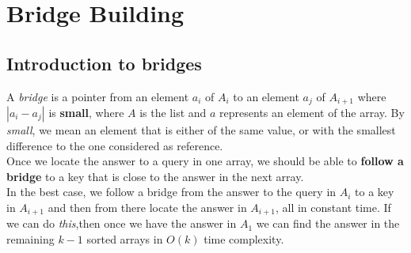\documentclass[11pt]{article}
\begin{document}
\begin{tcolorbox}[blanker,width=(\linewidth-3.5cm)]
\begin{algorithm}[H]
    \SetAlgoLined
    
    
    {
        
    }
    
    
    

\end{algorithm}
\end{tcolorbox}



\section{Bridge Building}
\subsection{Introduction to bridges}
A \textit{bridge} is a pointer from an element $a_i$ of $A_i$ to an element $a_j$ of $A_{i+1}$ where  $|a_i-a_j|$ is \textbf{small}, where $A$ is the list and $a$ represents an element of the array. By \textit{small}, we mean an element that is either of the same value, or with the smallest difference to the one considered as reference. \\ 

Once we locate the answer to a query in one array, we should be able to \textbf{follow a bridge} to a key that is close to the answer in the next array. \\
In the best case, we follow a bridge from the answer to the query in $A_i$ to a key in $A_{i+1}$ and then from there locate the answer in $A_{i+1}$, all in constant time. If we can do \textit{this},then once we have the answer in $A_1$ we can find the answer in the remaining $k-1$ sorted arrays in $O(k)$ time complexity. \\
\end{document}
